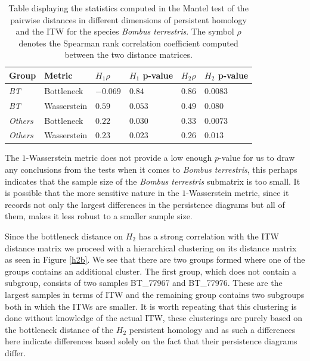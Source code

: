 \begin{table}[h]
\begin{center}

\begin{tabular}{*6l}    \toprule
Group  & Metric  & $H_{1} \rho $  & $H_{1}$ p-value  & $H_{2} \rho$ & $H_{2}$ p-value  \\ \midrule
\textit{BT} & Bottleneck & $-0.069$ & $0.84$ & $0.86$ & $0.0083$\\
\textit{BT} & Wasserstein & $0.59 $ & $0.053 $ & $0.49$ & $0.080$\\
\textit{Others}& Bottleneck & $0.22$ & $0.030$ & $0.33$ & $0.0073$\\
\textit{Others}& Wasserstein & $0.23$ & $0.023$ & $0.26$ & $0.013$\\\bottomrule
 \hline
\end{tabular}
\end{center}

\caption{\label{mantelc} Table displaying the statistics computed in the Mantel test of the pairwise distances in different dimensions of persistent homology and the ITW for the species \textit{Bombus terrestris}. The symbol $\rho$ denotes the Spearman rank correlation coefficient computed between the two distance matrices. }
\end{table}

The $1$-Wasserstein metric does not provide a low enough $p$-value for us to draw any conclusions from the tests when it comes to \textit{Bombus terrestris}, this perhaps indicates that the sample size of the \textit{Bombus terrestris} submatrix is too small. It is possible that the more sensitive nature in the $1$-Wasserstein metric, since it records not only the largest differences in the persistence diagrams but all of them, makes it less robust to a smaller sample size.

Since the bottleneck distance on $H_{2}$ has a strong correlation with the ITW distance matrix we proceed with a hierarchical clustering on its distance matrix as seen in Figure \ref{h2b}. We see that there are two groups formed where one of the groups contains an additional cluster. The first group, which does not contain a subgroup, consists of two samples BT\_77967 and BT\_77976. These are the largest samples in terms of ITW and the remaining group contains two subgroups both in which the ITWs are smaller. It is worth repeating that this clustering is done without knowledge of the actual ITW, these clusterings are purely based on the bottleneck distance of the $H_{2}$ persistent homology and as such a differences here indicate differences based solely on the fact that their persistence diagrams differ.

